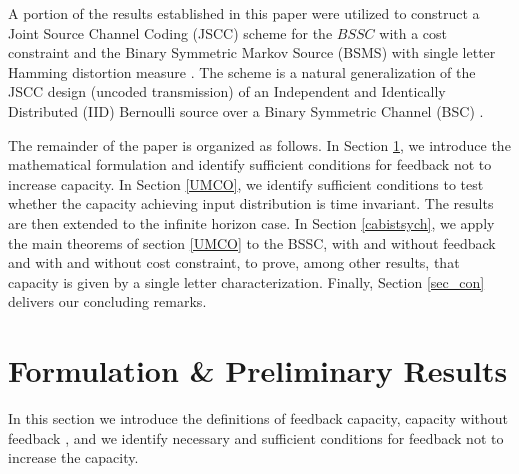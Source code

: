 \documentclass[11pt, a4paper, journal,onecolumn]{IEEEtran}
\begin{document}
\par A portion of the results established in this paper were utilized to construct a Joint Source Channel Coding (JSCC) scheme for the $BSSC$ with a cost constraint and the Binary Symmetric Markov Source (BSMS) with single letter Hamming distortion measure \cite{kcbisit2015}. The  scheme is a natural generalization of   the JSCC design (uncoded transmission) of an Independent and Identically Distributed (IID) Bernoulli source over a Binary Symmetric Channel (BSC) \cite{jelinek,gastpar}.  

\par The remainder of the paper is organized as follows. In Section \ref{section_form}, we introduce the mathematical formulation and identify sufficient conditions for feedback not to increase  capacity. In Section \ref{UMCO}, we 
 identify sufficient conditions 
to test whether  the capacity achieving input distribution is time invariant. The results are then extended to the infinite horizon case. In Section \ref{cabistsych}, we apply the main theorems of section \ref{UMCO}  to the BSSC, with and without feedback and with and without cost constraint, to prove, among other results, that capacity is given by a single letter characterization.  Finally,  Section \ref{sec_con}  delivers our concluding remarks. 


 








\section{Formulation \& Preliminary Results}
\label{section_form}
In this section we introduce the definitions of feedback capacity, capacity without feedback , and we identify necessary and sufficient conditions for feedback not to increase the capacity.
\end{document}
